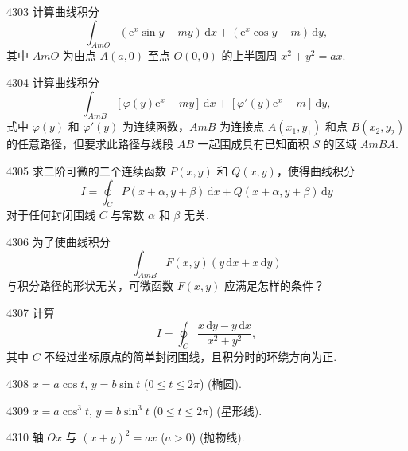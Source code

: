 \begin{prob}[M]{4303}
计算曲线积分
\[
\int_{AmO} (\mathrm{e}^x \sin y - my)\,\mathrm{d}x + (\mathrm{e}^x \cos y - m)\,\mathrm{d}y,
\]
其中 $AmO$ 为由点 $A(a,0)$ 至点 $O(0,0)$ 的上半圆周 $x^2 + y^2 = ax$.
\end{prob}

\begin{prob}[M]{4304}
计算曲线积分
\[
\int_{AmB} [\varphi(y)\mathrm{e}^x - my]\,\mathrm{d}x + [\varphi'(y)\mathrm{e}^x - m]\,\mathrm{d}y,
\]
式中 $\varphi(y)$ 和 $\varphi'(y)$ 为连续函数，$AmB$ 为连接点 $A(x_1, y_1)$ 和点 $B(x_2, y_2)$ 的任意路径，但要求此路径与线段 $AB$ 一起围成具有已知面积 $S$ 的区域 $AmBA$.
\end{prob}

\begin{prob}[M]{4305}
求二阶可微的二个连续函数 $P(x,y)$ 和 $Q(x,y)$，使得曲线积分
\[
I = \oint_C P(x + \alpha, y + \beta)\,\mathrm{d}x + Q(x + \alpha, y + \beta)\,\mathrm{d}y
\]
对于任何封闭围线 $C$ 与常数 $\alpha$ 和 $\beta$ 无关.
\end{prob}

\begin{prob}[M]{4306}
为了使曲线积分
\[
\int_{AmB} F(x,y)(y\,\mathrm{d}x + x\,\mathrm{d}y)
\]
与积分路径的形状无关，可微函数 $F(x,y)$ 应满足怎样的条件？
\end{prob}

\begin{prob}[M]{4307}
计算
\[
I = \oint_C \frac{x\,\mathrm{d}y - y\,\mathrm{d}x}{x^2 + y^2},
\]
其中 $C$ 不经过坐标原点的简单封闭围线，且积分时的环绕方向为正.
\end{prob}


\begin{prob}[S]{4308}
$x = a\cos t$, $y = b\sin t$ ($0 \leqslant t \leqslant 2\pi$) (椭圆).
\end{prob}

\begin{prob}[S]{4309}
$x = a\cos^3 t$, $y = b\sin^3 t$ ($0 \leqslant t \leqslant 2\pi$) (星形线).
\end{prob}

\begin{prob}[S]{4310}
轴 $Ox$ 与 $(x + y)^2 = ax$ ($a > 0$) (抛物线).
\end{prob}

